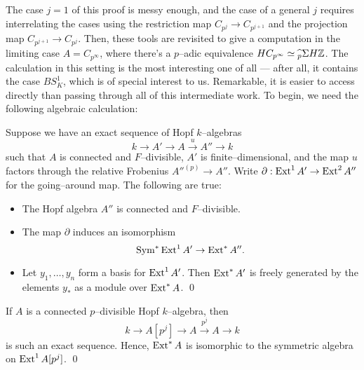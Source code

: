 
The case $j = 1$ of this proof is messy enough, and the case of a general $j$ requires interrelating the cases using the restriction map $C_{p^j} \to C_{p^{j+1}}$ and the projection map $C_{p^{j+1}} \to C_{p^j}$.  Then, these tools are revisited to give a computation in the limiting case $A = C_{p^\infty}$, where there's a $p$--adic equivalence $HC_{p^\infty} \simeq\widehat{{}_p} \Sigma H\mathbb Z$.  The calculation in this setting is the most interesting one of all --- after all, it contains the case $BS^1_K$, which is of special interest to us.  Remarkable, it is easier to access directly than passing through all of this intermediate work.  To begin, we need the following algebraic calculation:

\begin{theorem}
Suppose we have an exact sequence of Hopf $k$--algebras \[k \to A' \to A \xrightarrow{u} A'' \to k\] such that $A$ is connected and $F$--divisible, $A'$ is finite--dimensional, and the map $u$ factors through the relative Frobenius ${A''}^{(p)} \to A''$.  Write $\partial: \operatorname{Ext}^1 A' \to \operatorname{Ext}^2 A''$ for the going--around map.  The following are true:
\begin{itemize}
\item The Hopf algebra $A''$ is connected and $F$--divisible.
\item The map $\partial$ induces an isomorphism \[\operatorname{Sym}^* \operatorname{Ext}^1 A' \to \operatorname{Ext}^* A''.\]
\item Let $y_1, \ldots, y_n$ form a basis for $\operatorname{Ext}^1 A'$.  Then $\operatorname{Ext}^* A'$ is freely generated by the elements $y_*$ as a module over $\operatorname{Ext}^* A$. \qed
\end{itemize}
\end{theorem}

\begin{corollary}
If $A$ is a connected $p$--divisible Hopf $k$--algebra, then \[k \to A[p^j] \to A \xrightarrow{p^j} A \to k\] is such an exact sequence.  Hence, $\operatorname{Ext}^* A$ is isomorphic to the symmetric algebra on $\operatorname{Ext}^1 A[p^j]$.  \qed
\end{corollary}


